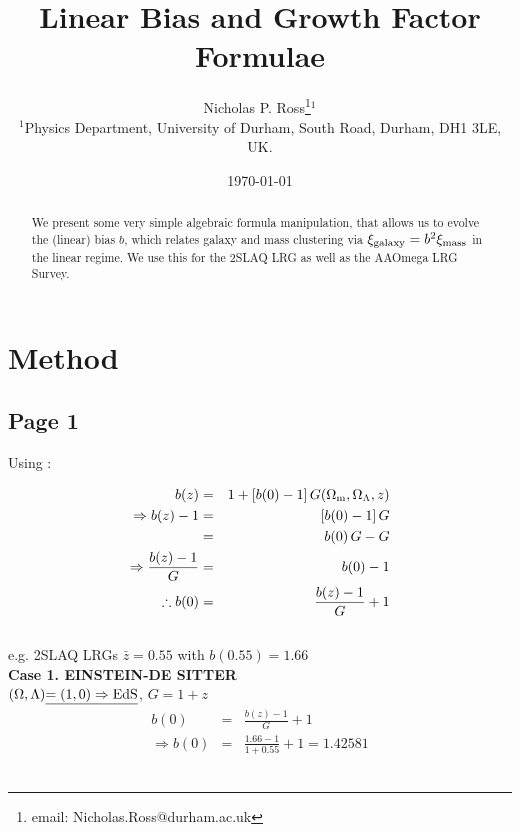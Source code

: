\documentclass[usenatbib]{mn2e}
\begin{document}
  


\title[Linear Bias and Growth Factor Formulae]
      {Linear Bias and Growth Factor Formulae}
\author[N.P. Ross et al.]
{Nicholas P. Ross\thanks{email: Nicholas.Ross@durham.ac.uk}$^1$ \\
$^1$Physics Department, University of Durham, 
    South Road, Durham, DH1 3LE, UK.\\}
\date{\today}
\maketitle

\begin{abstract}
We present some very simple algebraic formula manipulation, that allows us
to evolve the (linear) bias $b$, which relates galaxy and mass clustering via
$\xi_{\rm galaxy} = b^{2} \xi_{\rm mass}$ in the linear regime. 
We use this for the 2SLAQ LRG as well as the AAOmega LRG Survey. 
\end{abstract}



\section{Method}
\subsection{Page 1}
Using \citet{Fry96}:

\begin{eqnarray}
  b(z)                          & = & 1 + [b(0) - 1] \, G(\Omega_{\rm m}, \Omega_{\Lambda}, z) \\
  \Rightarrow   b(z) - 1        & = & [b(0) - 1] \, G  \\
                                & = & b(0) \, G - G  \\
  \Rightarrow  \frac{b(z)-1}{G} & = & b(0) - 1  \\
  \therefore               b(0) & = & \frac{b(z)-1}{G} + 1           
\end{eqnarray}
\\[12pt]


\noindent 
e.g. 2SLAQ LRGs $\bar{z}=0.55$ with $b(0.55)=1.66$ \\[8pt]
{\bf Case 1. EINSTEIN-DE SITTER}\\
$(\Omega,\Lambda)\underline{ =(1,0) \Rightarrow {\rm EdS}}$, $G=1+z$ \\

\begin{eqnarray}
                b(0) & = & \frac{b(z)-1}{G} + 1 \\
  \Rightarrow   b(0) & = & \frac{1.66-1}{1+0.55} + 1  = 1.42581
\end{eqnarray}
\\[8pt]
\end{document}
